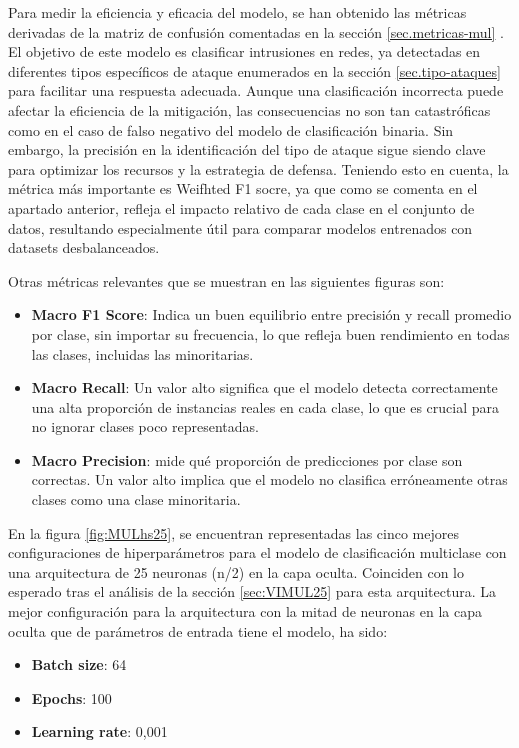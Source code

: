 Para medir la eficiencia y eficacia del modelo, se han obtenido las métricas derivadas de la matriz de confusión comentadas en la sección \ref{sec.metricas-mul} . El objetivo de este modelo es clasificar intrusiones en redes, ya detectadas en diferentes tipos específicos de ataque enumerados en la sección \ref{sec.tipo-ataques} para facilitar una respuesta adecuada. Aunque una clasificación incorrecta puede afectar la eficiencia de la mitigación, las consecuencias no son tan catastróficas como en el caso de falso negativo del modelo de clasificación binaria. Sin embargo, la precisión en la identificación del tipo de ataque sigue siendo clave para optimizar los recursos y la estrategia de defensa.
Teniendo esto en cuenta, la métrica más importante es Weifhted F1 socre, ya que como se comenta en el apartado anterior, refleja el impacto relativo de cada clase en el conjunto de datos, resultando especialmente útil para comparar modelos entrenados con datasets desbalanceados.

Otras métricas relevantes que se muestran en las siguientes figuras son:
\begin{itemize}
	\item \textbf{ Macro F1 Score}: Indica un buen equilibrio entre precisión y recall promedio por clase, sin importar su frecuencia, lo que refleja buen rendimiento en todas las clases, incluidas las minoritarias.
	\item \textbf{ Macro Recall}: Un valor alto significa que el modelo detecta correctamente una alta proporción de instancias reales en cada clase, lo que es crucial para no ignorar clases poco representadas.
	\item \textbf{Macro Precision}: mide qué proporción de predicciones por clase son correctas. Un valor alto implica que el modelo no clasifica erróneamente otras clases como una clase minoritaria.
\end{itemize}

En la figura \ref{fig:MULhs25}, se encuentran representadas las cinco mejores configuraciones de hiperparámetros para el modelo de clasificación multiclase con una arquitectura de 25 neuronas (n/2) en la capa oculta. Coinciden con lo esperado tras el análisis de la sección \ref{sec:VIMUL25} para esta arquitectura. La mejor configuración para la arquitectura con la mitad de neuronas en la capa oculta que de parámetros de entrada tiene el modelo, ha sido:
\begin{itemize}
	\item \textbf{Batch size}: 64
	\item \textbf{Epochs}: 100
	\item \textbf{Learning rate}: 0,001
\end{itemize}

